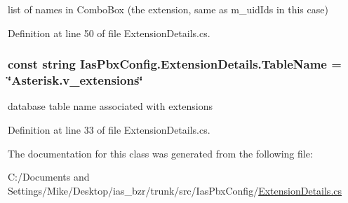 list of names in ComboBox (the extension, same as m\_\-uidIds in this case) 

Definition at line 50 of file ExtensionDetails.cs.\hypertarget{class_ias_pbx_config_1_1_extension_details_ab856c6ba9e3e93e697ea9228b3f39bf7}{
\subsubsection[{TableName}]{\setlength{\rightskip}{0pt plus 5cm}const string {\bf IasPbxConfig.ExtensionDetails.TableName} = \char`\"{}Asterisk.v\_\-extensions\char`\"{}}}
\label{class_ias_pbx_config_1_1_extension_details_ab856c6ba9e3e93e697ea9228b3f39bf7}


database table name associated with extensions 

Definition at line 33 of file ExtensionDetails.cs.

The documentation for this class was generated from the following file:\begin{DoxyCompactItemize}
\item 
C:/Documents and Settings/Mike/Desktop/ias\_\-bzr/trunk/src/IasPbxConfig/\hyperlink{_extension_details_8cs}{ExtensionDetails.cs}\end{DoxyCompactItemize}
